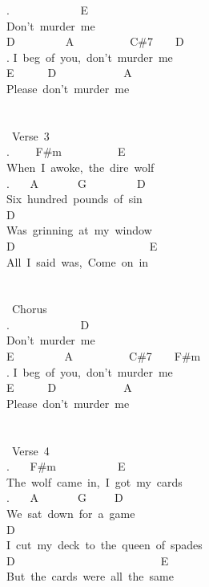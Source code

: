 {. \ \ \ \ \ \ \ \ \ \ \ \ E\\
Don't\ murder\ me\\
D\ \ \ \ \ \ \ \ \ A\ \ \ \ \ \ \ \ \ \ C\#7\ \ \ \ D\\
. I\ beg\ of\ you,\ don't\ murder\ me\\
E\ \ \ \ \ \ D\ \ \ \ \ \ \ \ \ \ \ \ A\\
Please\ don't\ murder\ me\\
\\
\\
\lbrack\ Verse\ 3\rbrack\\
. \ \ \ \ F\#m\ \ \ \ \ \ \ \ \ \ E\\
When\ I\ awoke,\ the\ dire\ wolf\\
. \ \ \ A\ \ \ \ \ \ \ G\ \ \ \ \ \ \ \ \ D\\
Six\ hundred\ pounds\ of\ sin\\
D\\
Was\ grinning\ at\ my\ window\\
D\ \ \ \ \ \ \ \ \ \ \ \ \ \ \ \ \ \ \ \ \ \ \ \ E\\
All\ I\ said\ was,\ \;Come\ on\ in\;\\
\\
\\
\lbrack\ Chorus\rbrack\\
. \ \ \ \ \ \ \ \ \ \ \ \ D\\
Don't\ murder\ me\\
E\ \ \ \ \ \ \ \ \ A\ \ \ \ \ \ \ \ \ \ C\#7\ \ \ \ F\#m\\
. I\ beg\ of\ you,\ don't\ murder\ me\\
E\ \ \ \ \ \ D\ \ \ \ \ \ \ \ \ \ \ \ A\\
Please\ don't\ murder\ me\\
\\
\\
\lbrack\ Verse\ 4\rbrack\\
. \ \ \ F\#m\ \ \ \ \ \ \ \ \ \ \ E\\
The\ wolf\ came\ in,\ I\ got\ my\ cards\\
. \ \ \ A\ \ \ \ \ \ \ G\ \ \ \ \ D\\
We\ sat\ down\ for\ a\ game\\
D\ \\
I\ cut\ my\ deck\ to\ the\ queen\ of\ spades\\
D\ \ \ \ \ \ \ \ \ \ \ \ \ \ \ \ \ \ \ \ \ \ \ \ \ \ E\\
But\ the\ cards\ were\ all\ the\ same\\
\\
}
